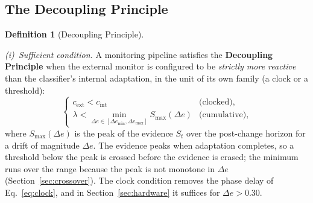 \documentclass[10pt,conference]{IEEEtran}
\theoremstyle{definition}
\newtheorem{definition}{Definition}
\begin{document}
\subsection{The Decoupling Principle}\label{sec:decoupling}

\begin{definition}[Decoupling Principle]\label{def:decoupling}

  \mbox{}\par
  \smallskip
  \emph{(i)~Sufficient condition.} A monitoring pipeline satisfies the \textbf{Decoupling Principle} when the external monitor is configured to be \emph{strictly more reactive} than the classifier's internal adaptation, in the unit of its own family (a clock or a threshold):
  \begin{equation}\label{eq:decoupling}
    \begin{cases}
      c_{\mathrm{ext}} < c_{\mathrm{int}}                                                 & \text{(clocked)},    \\
      \lambda < \min_{\Delta e \in [\Delta e_{\min}, \Delta e_{\max}]} S_{\max}(\Delta e) & \text{(cumulative)},
    \end{cases}
  \end{equation}
  where $S_{\max}(\Delta e)$ is the peak of the evidence $S_t$ over the post-change horizon for a drift of magnitude $\Delta e$. The evidence peaks when adaptation completes, so a threshold below the peak is crossed before the evidence is erased; the minimum runs over the range because the peak is not monotone in $\Delta e$ (Section~\ref{sec:crossover}). The clock condition removes the phase delay of Eq.~\eqref{eq:clock}, and in Section~\ref{sec:hardware} it suffices for $\Delta e > 0.30$.


\end{definition}
\end{document}
